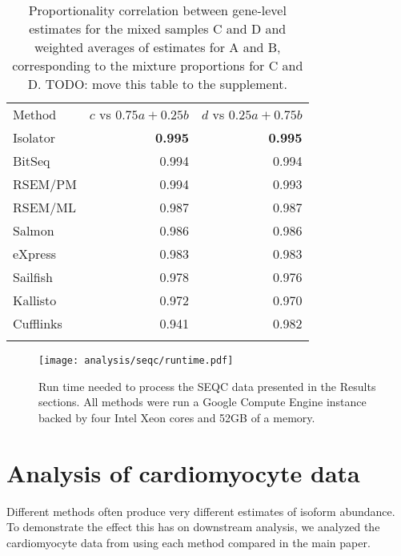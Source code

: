 \documentclass{article}
\begin{document}
\begin{table}
\begin{center}
\begin{tabular}[c]{@{}lrr@{}}
\toprule\addlinespace
Method & $c$ vs $0.75a + 0.25b$ & $d$ vs $0.25a + 0.75b$
\\\addlinespace
\midrule
Isolator & \textbf{0.995} & \textbf{0.995}
\\\addlinespace
BitSeq & 0.994 & 0.994
\\\addlinespace
RSEM/PM & 0.994 & 0.993
\\\addlinespace
RSEM/ML & 0.987 & 0.987
\\\addlinespace
Salmon & 0.986 & 0.986
\\\addlinespace
eXpress & 0.983 & 0.983
\\\addlinespace
Sailfish & 0.978 & 0.976
\\\addlinespace
Kallisto & 0.972 & 0.970
\\\addlinespace
Cufflinks & 0.941 & 0.982
\\\addlinespace
\bottomrule
\addlinespace
\end{tabular}
\caption{Proportionality correlation between gene-level estimates for
the mixed samples C and D and weighted averages of estimates for A and
B, corresponding to the mixture proportions for C and D. TODO: move this
table to the supplement.}
\end{center}
\label{table:seqcgenes}
\end{table}

\begin{figure}
\begin{center}
\texttt{[image: analysis/seqc/runtime.pdf]}
\caption{Run time needed to process the SEQC data presented in the Results
sections. All methods were run a Google Compute Engine instance backed by four
Intel Xeon cores and 52GB of a memory.}
\end{center}
\label{fig:runtime}
\end{figure}

\section{Analysis of cardiomyocyte data}

Different methods often produce very different estimates of isoform abundance.
To demonstrate the effect this has on downstream analysis, we analyzed the
cardiomyocyte data from \cite{Kuppusamy:2015ey} using each method compared in
the main paper.
\end{document}
